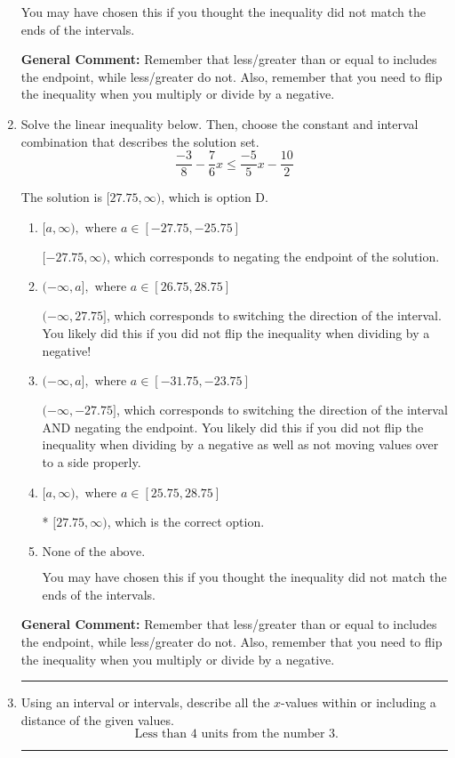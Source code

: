 \documentclass{extbook}[14pt]
\newcommand{\litem}[1]{\item #1

\rule{\textwidth}{0.4pt}}
\begin{document}
\begin{enumerate}
{\begin{enumerate}[label=\Alph*.]
You may have chosen this if you thought the inequality did not match the ends of the intervals.
\end{enumerate}

\textbf{General Comment:} Remember that less/greater than or equal to includes the endpoint, while less/greater do not. Also, remember that you need to flip the inequality when you multiply or divide by a negative.
}
\litem{
Solve the linear inequality below. Then, choose the constant and interval combination that describes the solution set.
\[ \frac{-3}{8} - \frac{7}{6} x \leq \frac{-5}{5} x - \frac{10}{2} \]

The solution is \( [27.75, \infty) \), which is option D.\begin{enumerate}[label=\Alph*.]
\item \( [a, \infty), \text{ where } a \in [-27.75, -25.75] \)

 $[-27.75, \infty)$, which corresponds to negating the endpoint of the solution.
\item \( (-\infty, a], \text{ where } a \in [26.75, 28.75] \)

 $(-\infty, 27.75]$, which corresponds to switching the direction of the interval. You likely did this if you did not flip the inequality when dividing by a negative!
\item \( (-\infty, a], \text{ where } a \in [-31.75, -23.75] \)

 $(-\infty, -27.75]$, which corresponds to switching the direction of the interval AND negating the endpoint. You likely did this if you did not flip the inequality when dividing by a negative as well as not moving values over to a side properly.
\item \( [a, \infty), \text{ where } a \in [25.75, 28.75] \)

* $[27.75, \infty)$, which is the correct option.
\item \( \text{None of the above}. \)

You may have chosen this if you thought the inequality did not match the ends of the intervals.
\end{enumerate}

\textbf{General Comment:} Remember that less/greater than or equal to includes the endpoint, while less/greater do not. Also, remember that you need to flip the inequality when you multiply or divide by a negative.
}
\litem{
Using an interval or intervals, describe all the $x$-values within or including a distance of the given values.
\[ \text{ Less than } 4 \text{ units from the number } 3. \]

}
\end{enumerate}
\end{document}
